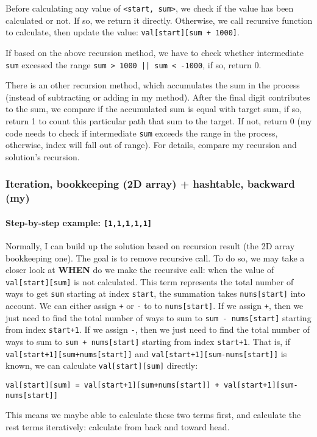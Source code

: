 \documentclass[11pt]{article}
\begin{document}
Before calculating any value of \texttt{<start, sum>}, we check if the value has been calculated or not. If so, we return it directly. Otherwise, we call recursive function to calculate, then update the value: \texttt{val[start][sum + 1000]}.

If based on the above recursion method, we have to check whether intermediate \texttt{sum} excessed the range \texttt{sum > 1000 || sum < -1000}, if so, return 0.

There is an other recursion method, which accumulates the sum in the process (instead of subtracting or adding in my method). After the final digit contributes to the sum, we compare if the accumulated sum is equal with target sum, if so, return 1 to count this particular path that sum to the target. If not, return 0 (my code needs to check if intermediate \texttt{sum} exceeds the range in the process, otherwise, index will fall out of range). For details, compare my recursion and solution's recursion.

\subsubsection{Iteration, bookkeeping (2D array) + hashtable, backward (my)}
\label{sec:orga117fa9}
\paragraph{Step-by-step example: \texttt{[1,1,1,1,1]}}
\label{sec:orgc087dbd}

Normally, I can build up the solution based on recursion result (the 2D array bookkeeping one). The goal is to remove recursive call. To do so, we may take a closer look at \textbf{WHEN} do we make the recursive call: when the value of \texttt{val[start][sum]} is not calculated. This term represents the total number of ways to get \texttt{sum} starting at index \texttt{start}, the summation takes \texttt{nums[start]} into account. We can either assign \texttt{+} or \texttt{-} to to \texttt{nums[start]}. If we assign \texttt{+}, then we just need to find the total number of ways to sum to \texttt{sum - nums[start]} starting from index \texttt{start+1}. If we assign \texttt{-}, then we just need to find the total number of ways to sum to \texttt{sum + nums[start]} starting from index \texttt{start+1}. That is, if \texttt{val[start+1][sum+nums[start]]} and \texttt{val[start+1][sum-nums[start]]} is known, we can calculate \texttt{val[start][sum]} directly:
\begin{verbatim}
val[start][sum] = val[start+1][sum+nums[start]] + val[start+1][sum-nums[start]]
\end{verbatim}
This means we maybe able to calculate these two terms first, and calculate the rest terms iteratively: calculate from back and toward head. 
\end{document}

